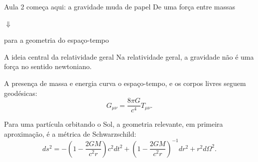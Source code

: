 \documentclass[aspectratio=169,10pt]{beamer}
\begin{document}
\begin{frame}{Aula 2 começa aqui: a gravidade muda de papel}
  \centering
  \vspace{0.6cm}
  {\Large\color{MercuryText}De uma força entre massas}

  \vspace{0.25cm}
  {\color{MercuryAccent}\Large$\Downarrow$}

  \vspace{0.25cm}
  {\Large\color{MercuryText}para a geometria do espaço-tempo}

  \vspace{0.7cm}
\end{frame}

\begin{frame}{A ideia central da relatividade geral}
  Na relatividade geral, a gravidade não é uma força no sentido newtoniano.

  \vspace{0.25cm}
  A presença de massa e energia curva o espaço-tempo, e os corpos livres seguem geodésicas:
  \[
    G_{\mu\nu} = \frac{8\pi G}{c^4}T_{\mu\nu}.
  \]

  \vspace{0.35cm}
  Para uma partícula orbitando o Sol, a geometria relevante, em primeira aproximação, é a métrica de Schwarzschild:
  \[
    ds^2 =
    -\left(1-\frac{2GM}{c^2r}\right)c^2dt^2
    +\left(1-\frac{2GM}{c^2r}\right)^{-1}dr^2
    +r^2d\Omega^2.
  \]
\end{frame}
\end{document}
